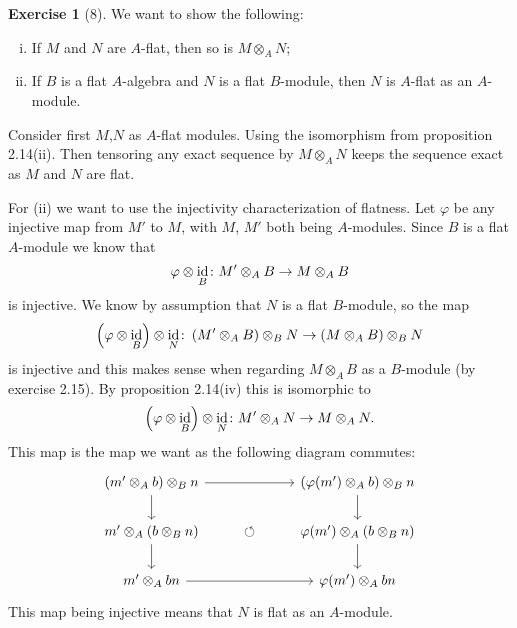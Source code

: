 \documentclass{article}
\theoremstyle{definition}
\newtheorem*{exercise}{Exercise}
\DeclareMathOperator{\id}{id}
\begin{document}
\begin{exercise}[8]
    We want to show the following:
    \begin{enumerate}[i)]
        \item If $M$ and $N$ are $A$-flat, then so is $M \otimes_A N$;
        \item If $B$ is a flat $A$-algebra and $N$ is a flat $B$-module, then
            $N$ is $A$-flat as an $A$-module.
    \end{enumerate}
    Consider first $M$,$N$ as $A$-flat modules. Using the isomorphism from
    proposition 2.14(ii). Then tensoring any exact sequence by $M \otimes_A N$
    keeps the sequence exact as $M$ and $N$ are flat.
    
    For (ii) we want to use the injectivity characterization of flatness. Let
    $\varphi$ be any injective map from $M'$ to $M$, with $M$, $M'$ both being
    $A$-modules. Since $B$ is a flat $A$-module we know that 
    \begin{equation}
        \notag
        \varphi \otimes \id_B \colon M' \otimes_A B \to M \otimes_A B
    \end{equation}
    is injective. We know by assumption that $N$ is a flat $B$-module, so 
    the map
    \begin{equation}
        \notag
        \left( \varphi \otimes \id_B \right) \otimes \id_N \colon \left(M'
        \otimes_A B \right) \otimes_B N \to \left( M \otimes_A B \right)
        \otimes_B N
    \end{equation}
    is injective and this makes sense when regarding $M \otimes_A B$ as a
    $B$-module (by exercise 2.15). By proposition 2.14(iv) this is
    isomorphic to
    \begin{equation}
        \notag
        \left( \varphi \otimes \id_B \right) \otimes \id_N \colon M' \otimes_A N \to M \otimes_A N.
    \end{equation}
    This map is the map we want as the following diagram commutes:
    \[
        \begin{tikzcd}
            (m' \otimes_A b) \otimes_B n \ar[rr]\ar[d] & &\left( \varphi(m') \otimes_A b\right) \otimes_B n \ar[d] \\
            m' \otimes_A (b \otimes_B n) \ar[d] & \circlearrowleft & \varphi(m') \otimes_A (b \otimes_B n) \ar[d] \\
            m' \otimes_A bn \ar[rr] & & \varphi(m')\otimes_A bn
        \end{tikzcd}
    \]
    This map being injective means that $N$ is flat as an $A$-module.
\end{exercise}
\end{document}
